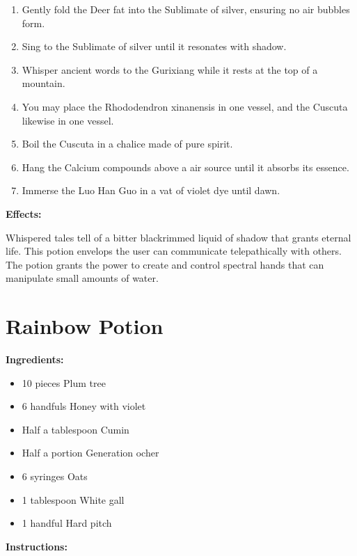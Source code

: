 \documentclass{article}
\begin{document}
\begin{enumerate}
  \item Gently fold the Deer fat into the Sublimate of silver, ensuring no air bubbles form.
  \item Sing to the Sublimate of silver until it resonates with shadow.
  \item Whisper ancient words to the Gurixiang while it rests at the top of a mountain.
  \item You may place the Rhododendron xinanensis in one vessel, and the Cuscuta likewise in one vessel.
  \item Boil the Cuscuta in a chalice made of pure spirit.
  \item Hang the Calcium compounds above a air source until it absorbs its essence.
  \item Immerse the Luo Han Guo in a vat of violet dye until dawn.
\end{enumerate}

\textbf{Effects:}

Whispered tales tell of a bitter blackrimmed liquid of shadow that grants eternal life. This potion envelops the user can communicate telepathically with others. The potion grants the power to create and control spectral hands that can manipulate small amounts of water.

\newpage
\section*{Rainbow Potion}

\textbf{Ingredients:}

\begin{itemize}
  \item 10 pieces Plum tree
  \item 6 handfuls Honey with violet
  \item Half a tablespoon Cumin
  \item Half a portion Generation ocher
  \item 6 syringes Oats
  \item 1 tablespoon White gall
  \item 1 handful Hard pitch
\end{itemize}

\textbf{Instructions:}
\end{document}
